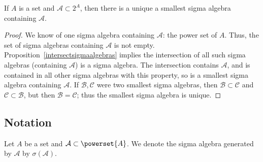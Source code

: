 \begin{proposition}
If $A$ is a set and $\mathcal{A}  \subset 2^A$, then there is a unique a smallest sigma algebra containing $\mathcal{A} $.\end{proposition}
\begin{proof}We know of one sigma algebra containing $\mathcal{A} $: the power set of $A$.
Thus, the set of sigma algebras containing $\mathcal{A} $ is not empty.
Proposition~\ref{intersectsigmaalgebras} implies the intersection of all such sigma algebras (containing $\mathcal{A} $) is a sigma algebra.
The intersection contains $\mathcal{A} $, and is contained in all other sigma algebras with this property, so is a smallest sigma algebra containing $\mathcal{A} $.
If $\mathcal{B} , \mathcal{C} $ were two smallest sigma algebras, then $\mathcal{B}  \subset \mathcal{C} $ and $\mathcal{C}  \subset \mathcal{B} $, but then $\mathcal{B}  = \mathcal{C} $; thus the smallest sigma algebra is unique.
\end{proof}
\subsection*{Notation}

Let $A$ be a set and $\mathcal{A}  \subset \powerset{A}$.
We denote the sigma algebra generated by $\mathcal{A} $ by $\sigma (\mathcal{A} )$.
